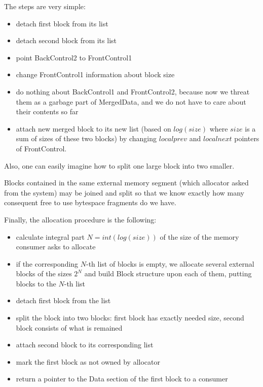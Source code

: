 \documentclass{article}
\begin{document}
The steps are very simple:

\begin{itemize}
\item detach first block from its list
\item detach second block from its list
\item point BackControl2 to FrontControl1
\item change FrontControl1 information about block size
\item do nothing about BackControl1 and FrontControl2, because now we threat them as a garbage part of MergedData, and we do not have to care about their contents so far
\item attach new merged block to its new list (based on $log(size)$ where $size$ is a sum of sizes of these two blocks) by changing $localprev$ and $localnext$ pointers of FrontControl.
\end{itemize}

Also, one can easily imagine how to split one large block into two smaller.

Blocks contained in the same external memory segment (which allocator asked from the system) may be joined and split so that we know exactly how many consequent free to use bytespace fragments do we have.

Finally, the allocation procedure is the following:

\begin{itemize}
\item calculate integral part $N = int(log(size))$ of the size of the memory consumer asks to allocate
\item if the corresponding $N$-th list of blocks is empty, we allocate several external blocks of the sizes $2^{N}$ and build Block structure upon each of them, putting blocks to the $N$-th list
\item detach first block from the list
\item split the block into two blocks: first block has exactly needed size, second block consists of what is remained
\item attach second block to its corresponding list
\item mark the first block as not owned by allocator
\item return a pointer to the Data section of the first block to a consumer
\end{itemize}
\end{document}

